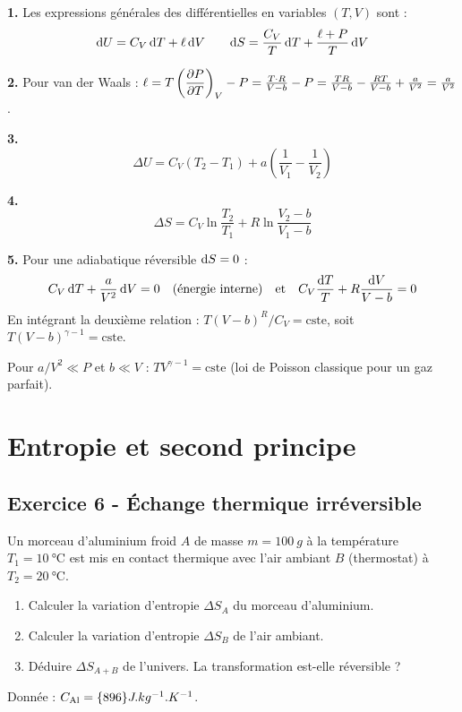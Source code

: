 \documentclass[12pt,a4paper]{article}
\begin{document}
\begin{boitecorrige}
\textbf{1.} Les expressions générales des différentielles en variables $(T,V)$ sont :
\[
\mathrm{d} U = C_V\,\mathrm{d} T + \ell\,\mathrm{d} V \qquad \mathrm{d} S = \frac{C_V}{T}\,\mathrm{d} T + \frac{\ell+P}{T}\,\mathrm{d} V
\]

\textbf{2.} Pour van der Waals : $\ell = T\left(\dfrac{\partial P}{\partial T}\right)_V - P = \frac{T\cdot R}{V-b} - P = \frac{TR}{V-b} - \frac{RT}{V-b} + \frac{a}{V^2} = \frac{a}{V^2}$.

\textbf{3.}
\[
\Delta U = C_V(T_2-T_1) + a\!\left(\frac{1}{V_1}-\frac{1}{V_2}\right)
\]

\textbf{4.}
\[
\Delta S = C_V\ln\frac{T_2}{T_1} + R\ln\frac{V_2-b}{V_1-b}
\]

\textbf{5.} Pour une adiabatique réversible $\mathrm{d} S = 0$ :
\[
C_V\,\mathrm{d} T + \frac{a}{V^2}\,\mathrm{d} V = 0 \quad \text{(énergie interne)} \quad \text{et} \quad C_V\frac{\mathrm{d} T}{T} + R\frac{\mathrm{d} V}{V-b} = 0
\]
En intégrant la deuxième relation : $T(V-b)^R/C_V = \text{cste}$, soit $T(V-b)^{\gamma-1} = \text{cste}$.

Pour $a/V^2 \ll P$ et $b \ll V$ : $T V^{\gamma-1} = \text{cste}$ (loi de Poisson classique pour un gaz parfait).
\end{boitecorrige}

\section{Entropie et second principe}

\subsection*{Exercice 6 - Échange thermique irréversible \niveau{\facile}}

\begin{boiteexercice}
Un morceau d'aluminium froid $A$ de masse $m = \qty{100}{g}$ à la température $T_1 = \qty{10}{\celsius}$ est mis en contact thermique avec l'air ambiant $B$ (thermostat) à $T_2 = \qty{20}{\celsius}$.
\begin{enumerate}
  \item Calculer la variation d'entropie $\Delta S_A$ du morceau d'aluminium.
  \item Calculer la variation d'entropie $\Delta S_B$ de l'air ambiant.
  \item Déduire $\Delta S_{A+B}$ de l'univers. La transformation est-elle réversible ?
\end{enumerate}
Donnée : $C_{\rm Al} = \qty{896}{J.kg^{-1}.K^{-1}}$.
\end{boiteexercice}
\end{document}

